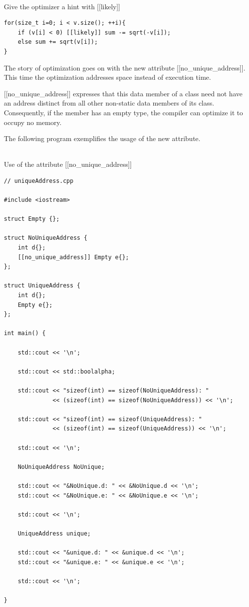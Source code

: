 \hspace*{\fill} \\ %
\noindent
Give the optimizer a hint with [[likely]]
\begin{lstlisting}[style=styleCXX]
for(size_t i=0; i < v.size(); ++i){
	if (v[i] < 0) [[likely]] sum -= sqrt(-v[i]);
	else sum += sqrt(v[i]);
}
\end{lstlisting}

The story of optimization goes on with the new attribute [[no\_unique\_address]]. This time the optimization addresses space instead of execution time.


[[no\_unique\_address]] expresses that this data member of a class need not have an address distinct from all other non-static data members of its class. Consequently, if the member has an empty type, the compiler can optimize it to occupy no memory.

The following program exemplifies the usage of the new attribute.

\hspace*{\fill} \\ %
\noindent
Use of the attribute [[no\_unique\_address]]
\begin{lstlisting}[style=styleCXX]
// uniqueAddress.cpp

#include <iostream>

struct Empty {};

struct NoUniqueAddress {
	int d{};
	[[no_unique_address]] Empty e{};
};

struct UniqueAddress {
	int d{};
	Empty e{};
};

int main() {

	std::cout << '\n';
	
	std::cout << std::boolalpha;
	
	std::cout << "sizeof(int) == sizeof(NoUniqueAddress): "
			  << (sizeof(int) == sizeof(NoUniqueAddress)) << '\n';
	
	std::cout << "sizeof(int) == sizeof(UniqueAddress): "
			  << (sizeof(int) == sizeof(UniqueAddress)) << '\n';
	
	std::cout << '\n';
	
	NoUniqueAddress NoUnique;
	
	std::cout << "&NoUnique.d: " << &NoUnique.d << '\n';
	std::cout << "&NoUnique.e: " << &NoUnique.e << '\n';
	
	std::cout << '\n';
	
	UniqueAddress unique;
	
	std::cout << "&unique.d: " << &unique.d << '\n';
	std::cout << "&unique.e: " << &unique.e << '\n';
	
	std::cout << '\n';

}
\end{lstlisting}

